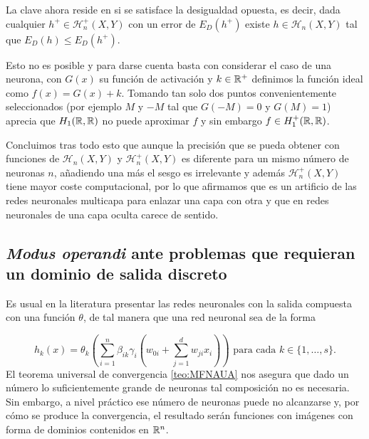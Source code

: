 \begin{aportacionOriginal}
 La clave ahora reside en si se satisface la desigualdad opuesta,
es decir, dada cualquier $h^+ \in \mathcal{H}^+_n(X,Y)$ con un error de $E_D(h^+)$ existe $h \in \mathcal{H}_n(X,Y)$  tal que $E_D(h) \leq E_D(h^+).$  

Esto no es posible y para darse cuenta basta con considerar el caso de una neurona, con $G(x)$ su función de activación y $k \in \mathbb{R}^+$ definimos la función ideal como $f(x) = G(x) +k$. 
Tomando tan solo dos puntos convenientemente seleccionados (por ejemplo $M$ y $-M$ tal que $G(-M) = 0$ y $G(M) = 1$) aprecia que $H_1(\mathbb{R}, \mathbb{R})$ no puede aproximar $f$ y sin embargo $f \in H^+_1(\mathbb{R}, \mathbb{R})$.


Concluimos tras todo esto que aunque la precisión
 que se pueda obtener con funciones de
 $\mathcal{H}_n(X,Y)$ y $\mathcal{H}^+_n(X,Y)$ es
  diferente para un mismo número de neuronas $n$,
  añadiendo una más el sesgo es irrelevante  y 
  además $\mathcal{H}^+_n(X,Y)$ tiene mayor coste
   computacional, por lo que afirmamos que 
es un artificio de las redes neuronales multicapa para enlazar una capa con otra y que en redes neuronales de una capa oculta carece de sentido.

\end{aportacionOriginal} %


\subsection{\textit{Modus operandi} ante problemas que requieran un dominio de salida discreto}
\label{ch05:dominio-discreto}

Es usual en la literatura presentar las redes neuronales con la salida compuesta con una función $\theta$, de tal manera que una red neuronal sea de la forma

\begin{equation}\label{red-neuronal-con-compuesta}
    h_k(x) = \theta_k 
    \left(
        \sum_{i=1}^{n} \beta_{i k} \gamma_{i}
    \left(
        w_{0 i} + \sum_{j=1}^d w_{j i } x_i
    \right) 
    \right)
    \text{ para cada  } k \in \{1, \ldots, s \}.
\end{equation}
El teorema universal de convergencia \ref{teo:MFNAUA} nos asegura 
que dado un número lo suficientemente grande de neuronas tal 
composición no es necesaria. Sin embargo, a nivel práctico ese 
número de neuronas puede no alcanzarse y, por cómo se produce la convergencia, el resultado serán funciones con imágenes con forma de dominios contenidos en $\mathbb{R}^n$.


